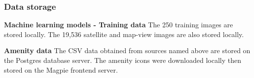 \subsubsection{Data storage}
\textbf{Machine learning models - Training data}
The 250 training images are stored locally.
The 19,536 satellite and map-view images are also stored locally.

\textbf{Amenity data}
The CSV data obtained from sources named above are stored on the Postgres database server.
The amenity icons were downloaded locally then stored on the Magpie frontend server.

